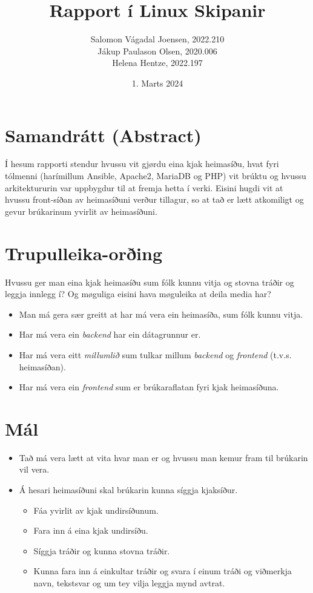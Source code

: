 \documentclass{article}
\title{Rapport í Linux Skipanir}
\author{Salomon Vágadal Joensen, 2022.210\\Jákup Paulason Olsen, 2020.006\\Helena Hentze, 2022.197}
\date{1. Marts 2024}
\begin{document}


\tableofcontents
\newpage

\section{Samandrátt (Abstract)}
\par Í hesum rapporti stendur hvussu vit gjørdu eina kjak heimasíðu, hvat fyri tólmenni
(harímillum Ansible, Apache2, MariaDB og PHP) vit brúktu og hvussu arkitektururin var uppbygdur
til at fremja hetta í verki. Eisini hugdi vit at hvussu front-síðan av heimasíðuni verður tillagur, 
so at tað er lætt atkomiligt og gevur brúkarinum yvirlit av heimasíðuni.

\section{Trupulleika-orðing}
\par Hvussu ger man eina kjak heimasíðu sum fólk kunnu vitja og stovna tráðir og leggja innlegg í? 
Og møguliga eisini hava møguleika at deila media har? 
\begin{itemize}
    \item Man má gera sær greitt at har má vera ein heimasíða, sum fólk kunnu vitja.
    \item Har má vera ein \textit{backend} har ein dátagrunnur er.
    \item Har má vera eitt \textit{millumlið} sum tulkar millum \textit{backend}
            og \textit{frontend} (t.v.s. heimasíðan).
    \item Har má vera ein \textit{frontend} sum er brúkaraflatan fyri kjak heimasíðuna.
\end{itemize}

\section{Mál}

\begin{itemize}
    \item Tað má vera lætt at vita hvar man er og hvussu man kemur fram til brúkarin vil vera.
    \item Á hesari heimasíðuni skal brúkarin kunna síggja kjaksíður.
    \begin{itemize}
        \item Fáa yvirlit av kjak undirsíðunum.
        \item Fara inn á eina kjak undirsíðu.
        \item Síggja tráðir og kunna stovna tráðir.
        \item Kunna fara inn á einkultar tráðir og svara í einum tráði og viðmerkja navn, tekstsvar og um tey vilja leggja mynd avtrat. 
    \end{itemize}
\end{itemize} 
\end{document}
